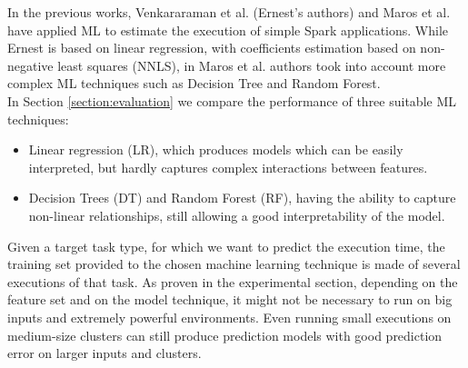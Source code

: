 \documentclass[a4paper, 10pt, conference]{ieeeconf}      %
\begin{document}
In the previous works, Venkararaman et al. \cite{ernest} (Ernest's authors)  and Maros et al.\cite{ARDAGNA2019} have applied ML to estimate the execution of simple Spark applications. While Ernest is based on linear regression, with coefficients estimation based on non-negative least squares (NNLS), in Maros et al. authors took into account more complex ML techniques such as Decision Tree and Random Forest.\\
In Section \ref{section:evaluation} we compare the performance of three suitable ML techniques:
\begin{itemize}
    \item Linear regression (LR), which produces models which can be easily interpreted, but hardly captures complex interactions between features.
    \item Decision Trees (DT) and Random Forest (RF), having the ability to capture non-linear relationships, still allowing a good interpretability of the model.
\end{itemize}

Given a target task type, for which we want to predict the execution time, the training set provided to the chosen machine learning technique is made of several executions of that task. 
As proven in the experimental section, depending on the feature set and on the model technique, it might not be necessary to run on big inputs and extremely powerful environments. Even running small executions on medium-size clusters can still produce prediction models with good prediction error on larger inputs and clusters.
\end{document}
